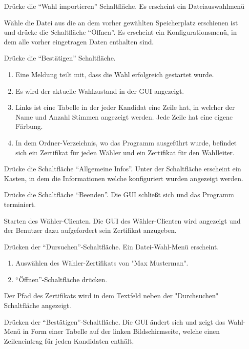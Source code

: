 \documentclass[parskip=full]{scrartcl}
\begin{document}
\teststep{}
		{Drücke die \enquote{Wahl importieren} Schaltfläche.}
		{Es erscheint ein Dateiauswahlmenü}

\teststep{}
		{Wähle die Datei aus die an dem vorher gewählten Speicherplatz erschienen ist und drücke die Schaltfläche \enquote{Öffnen}.}
		{Es erscheint ein Konfigurationsmenü, in dem alle vorher eingetragen Daten enthalten sind.}

\teststep{}
		{Drücke die \enquote{Bestätigen} Schaltfläche.}
		{\begin{enumerate}
				\item Eine Meldung teilt mit, dass die Wahl erfolgreich gestartet wurde.
				\item Es wird der aktuelle Wahlzustand in der GUI angezeigt.
				\item Links ist eine Tabelle in der jeder Kandidat eine Zeile hat, in welcher der Name und Anzahl Stimmen angezeigt werden. Jede Zeile hat eine eigene Färbung.
				\item In dem Ordner-Verzeichnis, wo das Programm ausgeführt wurde, befindet sich ein Zertifikat für jeden Wähler und ein Zertifikat für den Wahlleiter.
		\end{enumerate}}

\teststep{}
		{Drücke die Schaltfläche \enquote{Allgemeine Infos}.}
		{Unter der Schaltfläche erscheint ein Kasten, in dem die Informationen welche konfiguriert wurden angezeigt werden.}

\teststep{}
		{Drücke die Schaltfläche \enquote{Beenden}.}
		{Die GUI schließt sich und das Programm terminiert.}

\teststep{}
		{Starten des Wähler-Clienten.}
		{Die GUI des Wähler-Clienten wird angezeigt und der Benutzer dazu aufgefordert sein Zertifikat anzugeben.}

\teststep{}
		{Drücken der \enquote{Dursuchen}-Schaltfläche.}
		{Ein Datei-Wahl-Menü erscheint.}
	
\teststep{}
		{\begin{enumerate}
				\item Auswählen des Wähler-Zertifikats von "Max Musterman".
				\item \enquote{Öffnen}-Schaltfläche drücken.
		\end{enumerate}}
		{Der Pfad des Zertifikats wird in dem Textfeld neben der "Durchsuchen" Schaltfläche angezeigt.}
		
\teststep{}
		{Drücken der \enquote{Bestätigen}-Schaltfläche.}
		{Die GUI ändert sich und zeigt das Wahl-Menü in Form einer Tabelle auf der linken Bildschirmseite, welche einen Zeileneintrag für jeden Kandidaten enthält.}
\end{document}
